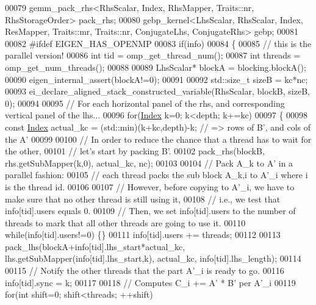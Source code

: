 \begin{DoxyCode}
00079   gemm\_pack\_rhs<RhsScalar, Index, RhsMapper, Traits::nr, RhsStorageOrder> pack\_rhs;
00080   gebp\_kernel<LhsScalar, RhsScalar, Index, ResMapper, Traits::mr, Traits::nr, ConjugateLhs, ConjugateRhs> 
      gebp;
00081 
00082 \textcolor{preprocessor}{#ifdef EIGEN\_HAS\_OPENMP}
00083   \textcolor{keywordflow}{if}(info)
00084   \{
00085     \textcolor{comment}{// this is the parallel version!}
00086     \textcolor{keywordtype}{int} tid = omp\_get\_thread\_num();
00087     \textcolor{keywordtype}{int} threads = omp\_get\_num\_threads();
00088 
00089     LhsScalar* blockA = blocking.blockA();
00090     eigen\_internal\_assert(blockA!=0);
00091 
00092     std::size\_t sizeB = kc*nc;
00093     ei\_declare\_aligned\_stack\_constructed\_variable(RhsScalar, blockB, sizeB, 0);
00094 
00095     \textcolor{comment}{// For each horizontal panel of the rhs, and corresponding vertical panel of the lhs...}
00096     \textcolor{keywordflow}{for}(\hyperlink{namespace_eigen_a62e77e0933482dafde8fe197d9a2cfde}{Index} k=0; k<depth; k+=kc)
00097     \{
00098       \textcolor{keyword}{const} \hyperlink{namespace_eigen_a62e77e0933482dafde8fe197d9a2cfde}{Index} actual\_kc = (std::min)(k+kc,depth)-k; \textcolor{comment}{// => rows of B', and cols of the A'}
00099 
00100       \textcolor{comment}{// In order to reduce the chance that a thread has to wait for the other,}
00101       \textcolor{comment}{// let's start by packing B'.}
00102       pack\_rhs(blockB, rhs.getSubMapper(k,0), actual\_kc, nc);
00103 
00104       \textcolor{comment}{// Pack A\_k to A' in a parallel fashion:}
00105       \textcolor{comment}{// each thread packs the sub block A\_k,i to A'\_i where i is the thread id.}
00106 
00107       \textcolor{comment}{// However, before copying to A'\_i, we have to make sure that no other thread is still using it,}
00108       \textcolor{comment}{// i.e., we test that info[tid].users equals 0.}
00109       \textcolor{comment}{// Then, we set info[tid].users to the number of threads to mark that all other threads are going to
       use it.}
00110       \textcolor{keywordflow}{while}(info[tid].users!=0) \{\}
00111       info[tid].users += threads;
00112 
00113       pack\_lhs(blockA+info[tid].lhs\_start*actual\_kc, lhs.getSubMapper(info[tid].lhs\_start,k), actual\_kc, 
      info[tid].lhs\_length);
00114 
00115       \textcolor{comment}{// Notify the other threads that the part A'\_i is ready to go.}
00116       info[tid].sync = k;
00117 
00118       \textcolor{comment}{// Computes C\_i += A' * B' per A'\_i}
00119       \textcolor{keywordflow}{for}(\textcolor{keywordtype}{int} shift=0; shift<threads; ++shift)

\end{DoxyCode}
